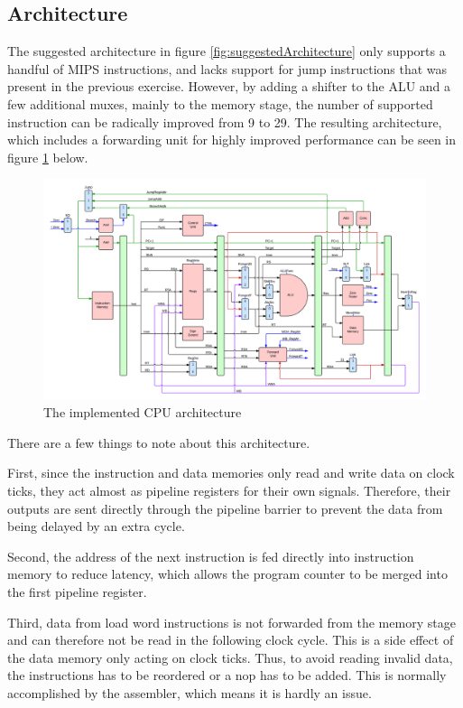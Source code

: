 \subsection{Architecture}

The suggested architecture in figure \ref{fig:suggestedArchitecture} only supports a handful of MIPS instructions, and lacks support for jump instructions that was present in the previous exercise.
However, by adding a shifter to the ALU and a few additional muxes, mainly to the memory stage, the number of supported instruction can be radically improved from 9 to 29.
The resulting architecture, which includes a forwarding unit for highly improved performance can be seen in figure \ref{fig:cpuArchitecture} below.

\begin{figure}[ht]
    \centering
    \includegraphics[width=\textwidth]{figures/Architecture.png}
    \caption{The implemented CPU architecture} 
    \label{fig:cpuArchitecture}
\end{figure}

There are a few things to note about this architecture.

First, since the instruction and data memories only read and write data on clock ticks, they act almost as pipeline registers for their own signals.
Therefore, their outputs are sent directly through the pipeline barrier to prevent the data from being delayed by an extra cycle.

Second, the address of the next instruction is fed directly into instruction memory to reduce latency, which allows the program counter to be merged into the first pipeline register.

Third, data from load word instructions is not forwarded from the memory stage and can therefore not be read in the following clock cycle.
This is a side effect of the data memory only acting on clock ticks.
Thus, to avoid reading invalid data, the instructions has to be reordered or a nop has to be added. This is normally accomplished by the assembler, which means it is hardly an issue.

